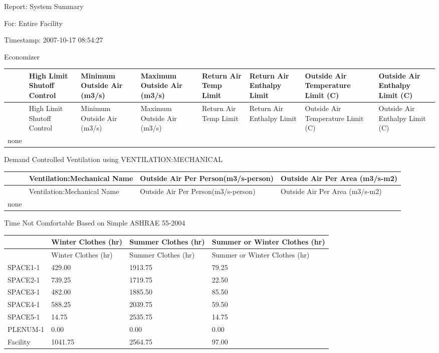 Report: System Summary

For: Entire Facility

Timestamp: 2007-10-17 08:54:27

Economizer

\begin{longtable}[c]{>{\raggedright}p{0.75in}>{\raggedright}p{0.75in}>{\raggedright}p{0.75in}>{\raggedright}p{0.75in}>{\raggedright}p{0.75in}>{\raggedright}p{0.75in}>{\raggedright}p{0.75in}>{\raggedright}p{0.75in}}
\toprule 
~ & High Limit Shutoff Control & Minimum Outside Air (m3/s) & Maximum Outside Air (m3/s) & Return Air Temp Limit & Return Air Enthalpy Limit & Outside Air Temperature Limit (C) & Outside Air Enthalpy Limit (C) \tabularnewline
\midrule
\endfirsthead

\toprule 
~ & High Limit Shutoff Control & Minimum Outside Air (m3/s) & Maximum Outside Air (m3/s) & Return Air Temp Limit & Return Air Enthalpy Limit & Outside Air Temperature Limit (C) & Outside Air Enthalpy Limit (C) \tabularnewline
\midrule
\endhead

none & ~ & ~ & ~ & ~ & ~ & ~ & ~ \tabularnewline
\bottomrule
\end{longtable}

Demand Controlled Ventilation using VENTILATION:MECHANICAL

\begin{longtable}[c]{>{\raggedright}p{1.5in}>{\raggedright}p{1.5in}>{\raggedright}p{1.5in}>{\raggedright}p{1.5in}}
\toprule 
~ & Ventilation:Mechanical Name & Outside Air Per Person(m3/s-person) & Outside Air Per Area (m3/s-m2) \tabularnewline
\midrule
\endfirsthead

\toprule 
~ & Ventilation:Mechanical Name & Outside Air Per Person(m3/s-person) & Outside Air Per Area (m3/s-m2) \tabularnewline
\midrule
\endhead

none & ~ & ~ & ~ \tabularnewline
\bottomrule
\end{longtable}

Time Not Comfortable Based on Simple ASHRAE 55-2004

\begin{longtable}[c]{>{\raggedright}p{1.5in}>{\raggedright}p{1.5in}>{\raggedright}p{1.5in}>{\raggedright}p{1.5in}}
\toprule 
~ & Winter Clothes (hr) & Summer Clothes (hr) & Summer or Winter Clothes (hr) \tabularnewline
\midrule
\endfirsthead

\toprule 
~ & Winter Clothes (hr) & Summer Clothes (hr) & Summer or Winter Clothes (hr) \tabularnewline
\midrule
\endhead

SPACE1-1 & 429.00 & 1913.75 & 79.25 \tabularnewline
SPACE2-1 & 739.25 & 1719.75 & 22.50 \tabularnewline
SPACE3-1 & 482.00 & 1885.50 & 85.50 \tabularnewline
SPACE4-1 & 588.25 & 2039.75 & 59.50 \tabularnewline
SPACE5-1 & 14.75 & 2535.75 & 14.75 \tabularnewline
PLENUM-1 & 0.00 & 0.00 & 0.00 \tabularnewline
Facility & 1041.75 & 2564.75 & 97.00 \tabularnewline
\bottomrule
\end{longtable}

